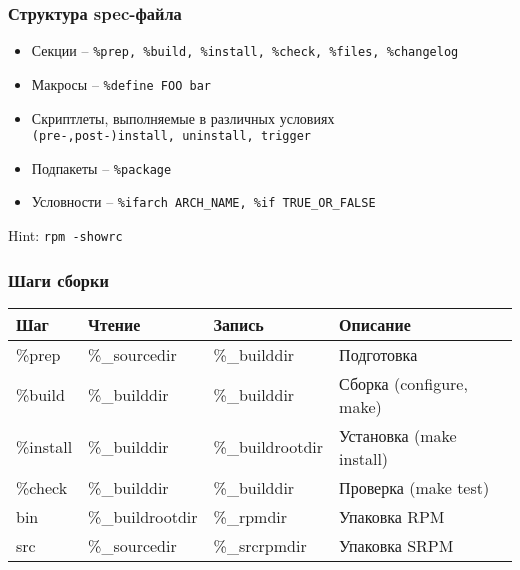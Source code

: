 \begin{frame}
	\frametitle{Структура spec-файла}

	\begin{itemize}
		\item Секции --  {\tt \%prep, \%build, \%install, \%check, \%files, \%changelog} 
		\item Макросы -- {\tt \%define FOO bar} 
		\item Скриптлеты, выполняемые в различных условиях\\
			{\tt (pre-,post-)install, uninstall, trigger}
		\item Подпакеты -- {\tt \%package}
		\item Условности -- {\tt \%ifarch ARCH\_NAME, \%if TRUE\_OR\_FALSE}
	\end{itemize}
	\begin{block}{Hint:}
		 {\tt rpm -\-showrc }
	\end{block}
\end{frame}



\begin{frame}
	\frametitle{Шаги сборки}	
	
			\begin{table}
				\begin{tabular}{l | l | l | l }
				Шаг & Чтение & Запись & Описание \\
				\hline 
				\%prep & \%\_sourcedir & \%\_builddir & Подготовка\\
				\%build & \%\_builddir & \%\_builddir & Сборка (configure, make)\\
				\%install & \%\_builddir & \%\_buildrootdir & Установка (make install)\\
				\%check &	\%\_builddir & \%\_builddir & Проверка (make test)\\
				\hline 
				bin & \%\_buildrootdir	&\%\_rpmdir & Упаковка RPM\\
				src & \%\_sourcedir & \%\_srcrpmdir & Упаковка SRPM\\
				\end{tabular}
			\end{table}			
\end{frame}

